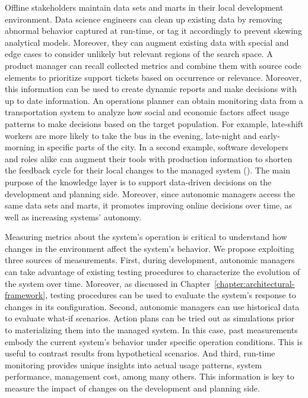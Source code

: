 \begin{description}[style=unboxed,leftmargin=0cm,font=\bfseries\normalsize]
	\item[Knowledge Maintenance\autodot] Offline stakeholders maintain data sets and \glspl{mart} in their local development environment. Data science engineers can clean up existing data by removing abnormal behavior captured at run-time, or tag it accordingly to prevent skewing analytical models. Moreover, they can augment existing data with special and edge cases to consider unlikely but relevant regions of the search space. A product manager can recall collected metrics and combine them with source code elements to prioritize support tickets based on occurrence or relevance. Moreover, this information can be used to create dynamic reports and make decisions with up to date information. An operations planner can obtain monitoring data from a transportation system to analyze how social and economic factors affect usage patterns to make decisions based on the target population. For example, late-shift workers are more likely to take the bus in the evening, late-night and early-morning in specific parts of the city. In a second example, software developers and roles alike can augment their tools with production information to shorten the feedback cycle for their local changes to the managed system (). The main purpose of the knowledge layer is to support data-driven decisions on the development and planning side. Moreover, since autonomic managers access the same data sets and \glspl{mart}, it promotes improving online decisions over time, as well as increasing systems' autonomy.

	\item[Measurement\autodot] Measuring metrics about the system's operation is critical to understand how changes in the environment affect the system's behavior. We propose exploiting three sources of measurements. First, during development, autonomic managers can take advantage of existing testing procedures to characterize the evolution of the system over time. Moreover, as discussed in Chapter~\ref{chapter:architectural-framework}, testing procedures can be used to evaluate the system's response to changes in its configuration. Second, autonomic managers can use historical data to evaluate what-if scenarios. Action plans can be tried out as simulations prior to materializing them into the managed system. In this case, past measurements embody the current system's behavior under specific operation conditions. This is useful to contrast results from hypothetical scenarios. And third, run-time monitoring provides unique insights into actual usage patterns, system performance, management cost, among many others. This information is key to measure the impact of changes on the development and planning side. 


\end{description}
